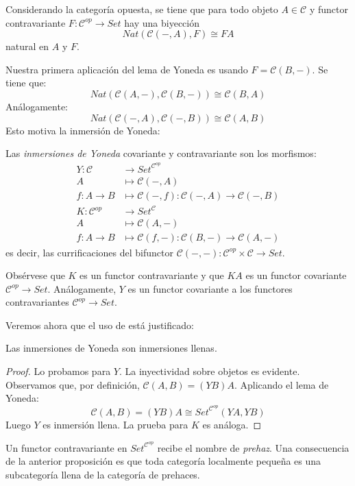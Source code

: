 \documentclass[12pt, twoside]{book}
\newcommand{\newterm}[1]{\index{#1}\emph{#1}}
\newcommand{\cat}{{\mathcal{C}}}
\newcommand{\Set}{{Set}}
\begin{document}
\begin{remark}
Considerando la categoría opuesta, se tiene que para todo objeto $A \in \cat$ y functor contravariante $F \colon \cat^{op} \to \Set$ hay una biyección
\[ Nat(\cat(-,A), F) \cong F A\]
natural en $A$ y $F$.
\end{remark}

Nuestra primera aplicación del lema de Yoneda es usando $F = \cat(B,-)$.
Se tiene que:
\[ Nat(\cat(A,-),\cat(B,-)) \cong \cat(B,A) \]
Análogamente:
\[ Nat(\cat(-,A),\cat(-,B)) \cong \cat(A,B) \]
Esto motiva la inmersión de Yoneda:
\begin{definition}
Las \emph{inmersiones de Yoneda} covariante y contravariante son los morfismos:
\begin{align*} 
  Y \colon \cat & \to \Set^{\cat^{op}}\\
  A & \mapsto \cat(-,A)\\
  f \colon A \to B & \mapsto \cat(-,f) \colon \cat(-,A) \to \cat(-,B)
\end{align*}
\begin{align*} 
  K \colon \cat^{op} & \to \Set^{\cat}\\
  A & \mapsto \cat(A,-)\\
  f \colon A \to B & \mapsto \cat(f,-) \colon \cat(B,-) \to \cat(A,-)
\end{align*}
es decir, las currificaciones del bifunctor $\cat(-,-) \colon \cat^{op} \times \cat \to \Set$.
\end{definition}
Obsérvese que $K$ es un functor contravariante y que $K A$ es un functor covariante $\cat^{op} \to \Set$.
Análogamente, $Y$ es un functor covariante a los functores contravariantes $\cat^{op} \to \Set$.

Veremos ahora que el uso de  está justificado:
\begin{proposition}
Las inmersiones de Yoneda son inmersiones llenas.
\end{proposition}
\begin{proof}
Lo probamos para $Y$.
La inyectividad sobre objetos es evidente.
Observamos que, por definición, $\cat(A,B) = (Y B)A$.
Aplicando el lema de Yoneda:
\[ \cat(A,B) = (Y B)A \cong \Set^{\cat^{op}}(Y A, Y B)\]
Luego $Y$ es inmersión llena.
La prueba para $K$ es análoga.
\end{proof}

Un functor contravariante en $\Set^{\cat^{op}}$ recibe el nombre de \newterm{prehaz}.
Una consecuencia de la anterior proposición es que toda categoría localmente pequeña es una subcategoría llena de la categoría de prehaces.
\end{document}
